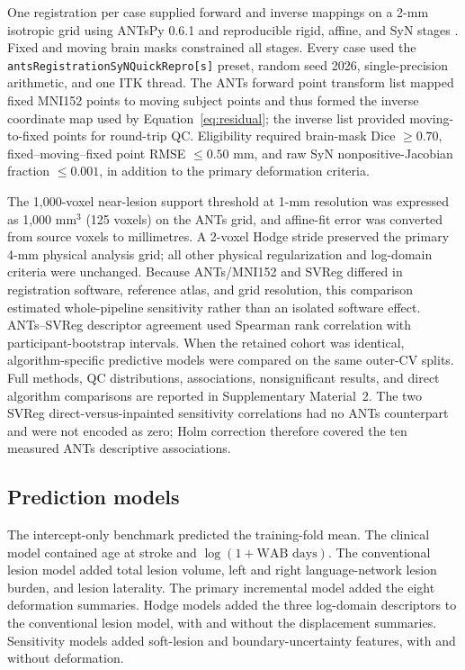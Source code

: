 \documentclass[11pt]{article}
\begin{document}
One registration per case supplied forward and inverse mappings on a 2-mm
isotropic grid using ANTsPy
0.6.1 and reproducible rigid, affine, and SyN stages
\citep{Avants2008,Avants2011}. Fixed and moving brain masks constrained all
stages. Every case used the
\texttt{antsRegistration}\allowbreak\texttt{SyNQuickRepro[s]} preset, random seed 2026,
single-precision arithmetic, and one ITK thread. The ANTs forward point
transform list mapped fixed MNI152 points to moving subject points and thus
formed the inverse coordinate map used by Equation~\ref{eq:residual}; the
inverse list provided moving-to-fixed points for round-trip QC. Eligibility
required brain-mask Dice $\geq0.70$, fixed--moving--fixed point RMSE
$\leq0.50$ mm, and raw SyN nonpositive-Jacobian fraction $\leq0.001$, in
addition to the primary deformation criteria.

The 1,000-voxel near-lesion support threshold at 1-mm resolution was expressed
as 1,000 mm$^3$ (125 voxels) on the ANTs grid, and affine-fit error was converted
from source voxels to millimetres. A 2-voxel Hodge stride preserved the primary
4-mm physical analysis grid; all other physical regularization and log-domain
criteria were unchanged. Because ANTs/MNI152 and SVReg differed in registration
software, reference atlas, and grid resolution, this comparison estimated
whole-pipeline sensitivity rather than an isolated software effect.
ANTs--SVReg descriptor agreement used Spearman rank
correlation with participant-bootstrap intervals. When the retained cohort was
identical, algorithm-specific predictive models were compared on the same
outer-CV splits. Full methods, QC distributions, associations, nonsignificant
results, and direct algorithm comparisons are reported in Supplementary
Material~2. The two SVReg direct-versus-inpainted sensitivity correlations had
no ANTs counterpart and were not encoded as zero; Holm correction therefore
covered the ten measured ANTs descriptive associations.

\subsection{Prediction models}

The intercept-only benchmark predicted the training-fold mean. The clinical
model contained age at stroke and $\log(1+\text{WAB days})$. The conventional
lesion model added total lesion volume, left and right language-network lesion
burden, and lesion laterality. The primary incremental model added the eight
deformation summaries. Hodge models added the three log-domain descriptors to
the conventional lesion model, with and without the displacement summaries.
Sensitivity models added soft-lesion and boundary-uncertainty features, with
and without deformation.
\end{document}
